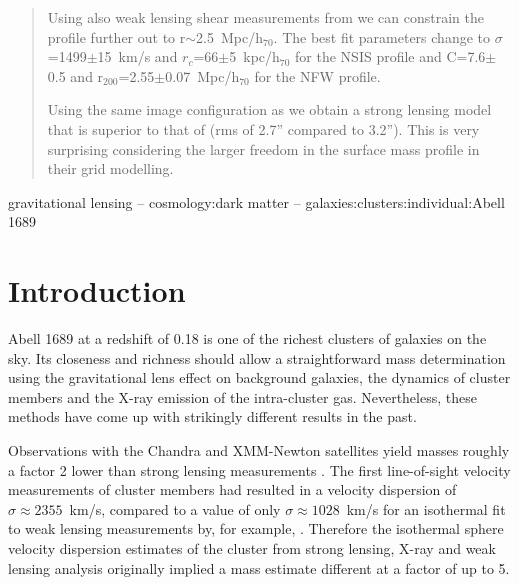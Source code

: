 \documentclass[useAMS,usenatbib]{mn2e}
\newcounter{one}   \setcounter{one}{1}
\begin{document}
\begin{abstract}
    Using also weak lensing shear measurements from
    \citet{broadhurst:05b} we can constrain the profile further out to
    r$\sim$2.5~Mpc/h$_{70}$. The best fit parameters change to
    $\sigma$=1499$\pm$15~km/s and $r_c$=66$\pm$5~kpc/h$_{70}$ for the
    NSIS profile and C=7.6$\pm$0.5 and
    r$_{200}$=2.55$\pm$0.07~Mpc/h$_{70}$ for the NFW profile.

    Using the same image configuration as \citet{broadhurst:05} we
    obtain a strong lensing model that is superior to that of
    \citet{broadhurst:05} (rms of 2.7'' compared to 3.2''). This is
    very surprising considering the larger freedom in the surface mass
    profile in their grid modelling.
  \end{abstract}

     
  \begin{keywords}
    gravitational lensing -- cosmology:dark matter --
    galaxies:clusters:individual:Abell 1689
  \end{keywords} 

%

\section{Introduction}

Abell 1689 at a redshift of 0.18 is one of the richest clusters of
galaxies on the sky. Its closeness and richness should allow a
straightforward mass determination using the gravitational lens effect
on background galaxies, the dynamics of cluster members and the
\mbox{X-ray} emission of the intra-cluster gas. Nevertheless, these
methods have come up with strikingly different results in the past.

Observations with the Chandra \citep{xue:02} and XMM-Newton
\citep{andersson:04} satellites yield masses roughly a factor 2 lower
than strong lensing measurements \citep[e.g.][]{dye:01}.  The first
line-of-sight velocity measurements of cluster members
\citep{teague:90} had resulted in a velocity dispersion of $\sigma
\approx 2355$~km/s, compared to a value of only $\sigma\approx
1028$~km/s for an isothermal fit to weak lensing measurements by, for
example, \citet{king:02b}. Therefore the isothermal sphere velocity
dispersion estimates of the cluster from strong lensing, \mbox{X-ray}
and weak lensing analysis originally implied a mass estimate different
at a factor of up to 5.
\end{document}
